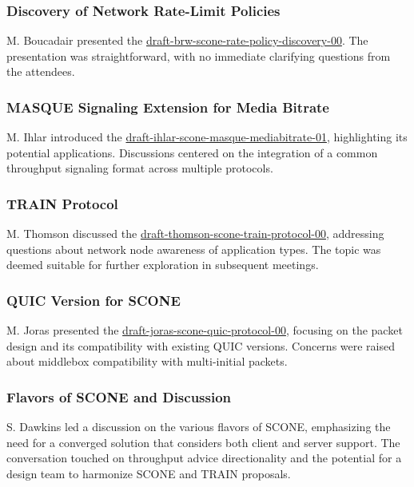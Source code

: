 \documentclass{article}
\begin{document}
\subsubsection{Discovery of Network Rate-Limit Policies}

M. Boucadair presented the \href{https://datatracker.ietf.org/doc/html/draft-brw-scone-rate-policy-discovery-00}{draft-brw-scone-rate-policy-discovery-00}. The presentation was straightforward, with no immediate clarifying questions from the attendees.

\subsubsection{MASQUE Signaling Extension for Media Bitrate}

M. Ihlar introduced the \href{https://datatracker.ietf.org/doc/html/draft-ihlar-scone-masque-mediabitrate-01}{draft-ihlar-scone-masque-mediabitrate-01}, highlighting its potential applications. Discussions centered on the integration of a common throughput signaling format across multiple protocols.

\subsubsection{TRAIN Protocol}

M. Thomson discussed the \href{https://datatracker.ietf.org/doc/html/draft-thomson-scone-train-protocol-00}{draft-thomson-scone-train-protocol-00}, addressing questions about network node awareness of application types. The topic was deemed suitable for further exploration in subsequent meetings.

\subsubsection{QUIC Version for SCONE}

M. Joras presented the \href{https://datatracker.ietf.org/doc/html/draft-joras-scone-quic-protocol-00}{draft-joras-scone-quic-protocol-00}, focusing on the packet design and its compatibility with existing QUIC versions. Concerns were raised about middlebox compatibility with multi-initial packets.

\subsubsection{Flavors of SCONE and Discussion}

S. Dawkins led a discussion on the various flavors of SCONE, emphasizing the need for a converged solution that considers both client and server support. The conversation touched on throughput advice directionality and the potential for a design team to harmonize SCONE and TRAIN proposals.
\end{document}
